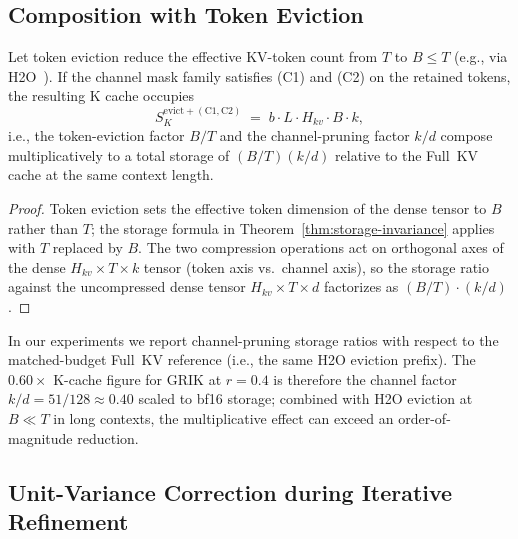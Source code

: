\documentclass{article}
\begin{document}
\subsection{Composition with Token Eviction}
\label{app:composition}
 
\begin{proposition}
\label{prop:composition}
Let token eviction reduce the effective KV-token count from $T$ to $B \leq T$ (e.g., via H2O~\citep{h2o}). If the channel mask family satisfies (C1) and (C2) on the retained tokens, the resulting K cache occupies
\begin{equation}
S_K^{\mathrm{evict + (C1, C2)}} \;=\; b \cdot L \cdot H_{kv} \cdot B \cdot k,
\end{equation}
i.e., the token-eviction factor $B/T$ and the channel-pruning factor $k/d$ compose multiplicatively to a total storage of $(B/T)(k/d)$ relative to the Full~KV cache at the same context length.
\end{proposition}
 
\begin{proof}
Token eviction sets the effective token dimension of the dense tensor to $B$ rather than $T$; the storage formula in Theorem~\ref{thm:storage-invariance} applies with $T$ replaced by $B$. The two compression operations act on orthogonal axes of the dense $H_{kv} \times T \times k$ tensor (token axis vs.\ channel axis), so the storage ratio against the uncompressed dense tensor $H_{kv} \times T \times d$ factorizes as $(B/T) \cdot (k/d)$.
\end{proof}
 
\begin{remark}
In our experiments we report channel-pruning storage ratios with respect to the matched-budget Full~KV reference (i.e., the same H2O eviction prefix). The $0.60\times$ K-cache figure for GRIK at $r{=}0.4$ is therefore the channel factor $k/d = 51/128 \approx 0.40$ scaled to bf16 storage; combined with H2O eviction at $B \ll T$ in long contexts, the multiplicative effect can exceed an order-of-magnitude reduction.
\end{remark}
 
\subsection{Unit-Variance Correction during Iterative Refinement}
\label{app:variance}
 
\end{document}

